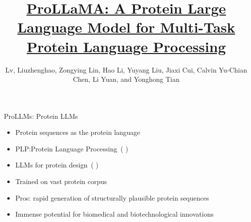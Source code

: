 \documentclass[dvipsnames,
hyperref={
	citecolor=blue,
	colorlinks=true,
	urlcolor=blue,
	linkcolor=,
}
]{beamer}
\title[ProLLaMA]
{\href{https://doi.org/10.48550/arXiv.2402.16445}{ProLLaMA: A Protein Large Language Model for Multi-Task Protein Language Processing}}
\author[Liuzhenghao Lv et al.]{Lv, Liuzhenghao, Zongying Lin, Hao Li, Yuyang Liu, Jiaxi Cui, Calvin Yu-Chian Chen, Li Yuan, and Yonghong Tian}
\date{}%
\let\oldcite\cite
\renewcommand{\cite}[1]{{\color{blue} \oldcite{#1}}}
\begin{document}
\begin{frame}
\titlepage
\end{frame}




\begin{frame}{ProLLMs: Protein LLMs}
	\begin{itemize}\setlength\itemsep{1.5em}
		\item Protein sequences as the protein language
		\item PLP:Protein Language Processing~(\cite{bepler2021learning,ofer2021language})
		\item LLMs for protein design~(\cite{strokach2022deep,ferruz2022controllable})~
		\item Trained on vast protein corpus
		\item Pros: rapid generation of structurally plausible protein sequences
		\item Immense potential for biomedical and biotechnological innovations
	\end{itemize}
\end{frame}


\end{document}
